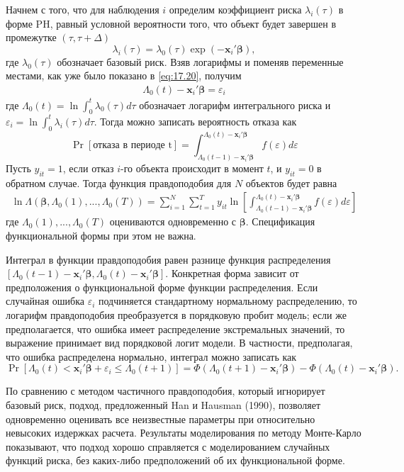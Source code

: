 Начнем с того, что для наблюдения $i$ определим коэффициент риска $\lambda_i(\tau)$ в форме PH, равный условной вероятности того, что объект будет завершен в промежутке $(\tau,\tau+\Delta)$
        $$\lambda_i(\tau)=\lambda_0(\tau)\exp(-\mathbf{x}_i'\bm{\beta}),$$
где $\lambda_0(\tau)$ обозначает базовый риск. Взяв логарифмы и поменяв переменные местами, как уже было показано в \ref{eq:17.20}, получим
        \begin{align}
        \label{eq:17.43}
        \Lambda_0(t)-\mathbf{x}_i'\bm{\beta}=\varepsilon_i
        \end{align}
где $\Lambda_0(t)=\ln\int^{t}_{0}\lambda_0(\tau)d\tau$ обозначает логарифм интегрального риска и $\varepsilon_i=\ln\int^{t}_{0}\lambda_i(\tau)d\tau$. Тогда можно записать вероятность отказа как
        $$\Pr[\textrm{отказа в периоде t}]=\int^{\Lambda_0(t)-\mathbf{x}_i'\bm{\beta}}_{\Lambda_0(t-1)-\mathbf{x}_i'\bm{\beta}}f(\varepsilon)d\varepsilon$$
Пусть $y_{it}=1$, если отказ $i$-го объекта происходит в момент $t$, и $y_{it}=0$ в обратном случае. Тогда функция правдоподобия для $N$ объектов будет равна
        \begin{align}
        \label{eq:17.44}
        \ln\Lambda(\bm{\beta},\Lambda_0(1),...,\Lambda_0(T))=\sum^{N}_{i=1}\sum^{T}_{t=1}y_{it}\ln\left[\int^{\Lambda_0(t)-\mathbf{x}_i'\bm{\beta}}_{\Lambda_0(t-1)-\mathbf{x}_i'\bm{\beta}}f(\varepsilon)d\varepsilon\right]
        \end{align}
где $\Lambda_0(1),...,\Lambda_0(T)$ оцениваются одновременно с $\bm{\beta}$. Спецификация функциональной формы при этом не важна.

Интеграл в функции правдоподобия равен разнице функция распределения $[\Lambda_0(t-1)-\mathbf{x}_i'\bm{\beta},\Lambda_0(t)-\mathbf{x}_i'\bm{\beta}]$. Конкретная форма зависит от предположения о функциональной форме функции распределения. Если случайная ошибка $\varepsilon_i$ подчиняется стандартному нормальному распределению, то логарифм правдоподобия преобразуется в порядковую пробит модель; если же предполагается, что ошибка имеет распределение экстремальных значений, то выражение принимает вид порядковой логит модели. В частности, предполагая, что ошибка распределена нормально, интеграл можно записать как
    $$\Pr[\Lambda_0(t)<\mathbf{x}_i'\bm{\beta}+\varepsilon_i\le\Lambda_0(t+1)]=\Phi(\Lambda_0(t+1)-\mathbf{x}_i'\bm{\beta})-\Phi(\Lambda_0(t)-\mathbf{x}_i'\bm{\beta}).$$

По сравнению с методом частичного правдоподобия, который игнорирует базовый риск, подход, предложенный Han и Hausman (1990), позволяет одновременно оценивать все неизвестные параметры при относительно невысоких издержках расчета. Результаты моделирования по методу Монте-Карло показывают, что подход хорошо справляется с моделированием случайных функций риска, без каких-либо предположений об их функциональной форме.

